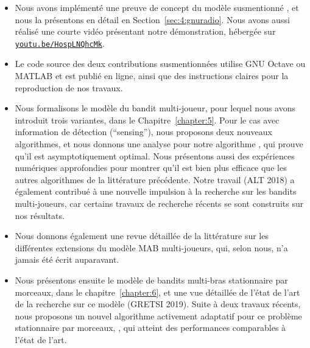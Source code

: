 \begin{resume_fr}
\begin{itemize}
    \item
    Nous avons implémenté une preuve de concept du modèle susmentionné \cite{Besson2018ICT}, et nous la présentons en détail en Section~\ref{sec:4:gnuradio}. Nous avons aussi réalisé une courte vidéo présentant notre démonstration, hébergée sur \texttt{\href{https://youtu.be/HospLNQhcMk}{youtu.be/HospLNQhcMk}}.

    \item
    Le code source des deux contributions susmentionnées utilise GNU Octave ou MATLAB et est publié en ligne, ainsi que des instructions claires pour la reproduction de nos travaux.

    \item
    Nous formalisons le modèle du bandit multi-joueur, pour lequel nous avons introduit trois variantes, dans le Chapitre~\ref{chapter:5}.
    Pour le cas avec information de détection (``sensing''), nous proposons deux nouveaux algorithmes, et nous donnons une analyse pour notre algorithme \MCTopM, qui prouve qu'il est asymptotiquement optimal.
    Nous présentons aussi des expériences numériques approfondies pour montrer qu'il est bien plus efficace que les autres algorithmes de la littérature précédente.
    Notre travail \cite{Besson2018ALT} (ALT 2018) a également contribué à une nouvelle impulsion à la recherche sur les bandits multi-joueurs, car certains travaux de recherche récents se sont construits sur nos résultats.

    \item
    Nous donnons également une revue détaillée de la littérature sur les différentes extensions du modèle MAB multi-joueurs, qui, selon nous, n'a jamais été écrit auparavant.

    \item
    Nous présentons ensuite le modèle de bandits multi-bras stationnaire par morceaux, dans le chapitre~\ref{chapter:6}, et une vue détaillée de l'état de l'art de la recherche sur ce modèle \cite{Besson2019GLRT,Besson2019Gretsi} (GRETSI 2019).
    Suite à deux travaux récents, nous proposons un nouvel algorithme activement adaptatif pour ce problème stationnaire par morceaux, \GLRklUCB, qui atteint des performances comparables à l'état de l'art.


\end{itemize}
\end{resume_fr}
